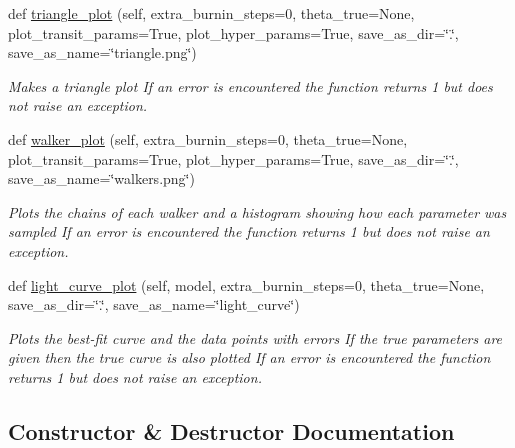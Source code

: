 \begin{DoxyCompactItemize}
def \hyperlink{classexospec_1_1mcmc_1_1_m_c_m_c_af240e8deac4470da704239926ea56822}{triangle\+\_\+plot} (self, extra\+\_\+burnin\+\_\+steps=0, theta\+\_\+true=None, plot\+\_\+transit\+\_\+params=True, plot\+\_\+hyper\+\_\+params=True, save\+\_\+as\+\_\+dir=\char`\"{}.\char`\"{}, save\+\_\+as\+\_\+name=\char`\"{}triangle.\+png\char`\"{})
\begin{DoxyCompactList}\small\item\em Makes a triangle plot If an error is encountered the function returns 1 but does not raise an exception. \end{DoxyCompactList}\item 
def \hyperlink{classexospec_1_1mcmc_1_1_m_c_m_c_a741c2882baef53c1fa19b2c086ec8261}{walker\+\_\+plot} (self, extra\+\_\+burnin\+\_\+steps=0, theta\+\_\+true=None, plot\+\_\+transit\+\_\+params=True, plot\+\_\+hyper\+\_\+params=True, save\+\_\+as\+\_\+dir=\char`\"{}.\char`\"{}, save\+\_\+as\+\_\+name=\char`\"{}walkers.\+png\char`\"{})
\begin{DoxyCompactList}\small\item\em Plots the chains of each walker and a histogram showing how each parameter was sampled If an error is encountered the function returns 1 but does not raise an exception. \end{DoxyCompactList}\item 
def \hyperlink{classexospec_1_1mcmc_1_1_m_c_m_c_a4eef4b5f8fd95075890dfaf74d624c11}{light\+\_\+curve\+\_\+plot} (self, model, extra\+\_\+burnin\+\_\+steps=0, theta\+\_\+true=None, save\+\_\+as\+\_\+dir=\char`\"{}.\char`\"{}, save\+\_\+as\+\_\+name=\char`\"{}light\+\_\+curve\char`\"{})
\begin{DoxyCompactList}\small\item\em Plots the best-\/fit curve and the data points with errors If the true parameters are given then the true curve is also plotted If an error is encountered the function returns 1 but does not raise an exception. \end{DoxyCompactList}\end{DoxyCompactItemize}


\subsection{Constructor \& Destructor Documentation}
\mbox{\label{classexospec_1_1mcmc_1_1_m_c_m_c_aae17f42d9fa567e61df69f7c808aa931}} 
